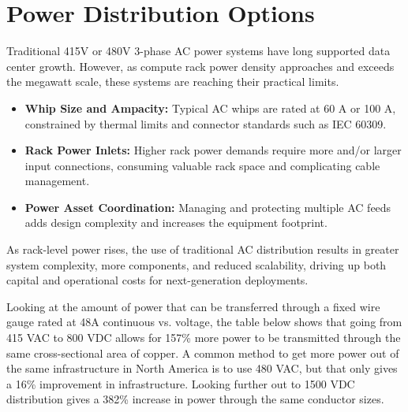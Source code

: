 \section{Power Distribution Options}

Traditional 415V or 480V 3-phase AC power systems have long supported data center growth. However, as compute rack power density approaches and exceeds the megawatt scale, these systems are reaching their practical limits.

\begin{itemize}
\item \textbf{Whip Size and Ampacity:} Typical AC whips are rated at 60 A or 100 A, constrained by thermal limits and connector standards such as IEC 60309.

\item \textbf{Rack Power Inlets:} Higher rack power demands require more and/or larger input connections, consuming valuable rack space and complicating cable management.

\item \textbf{Power Asset Coordination:} Managing and protecting multiple AC feeds adds design complexity and increases the equipment footprint.
\end{itemize}

As rack-level power rises, the use of traditional AC distribution results in greater system complexity, more components, and reduced scalability, driving up both capital and operational costs for next-generation deployments.

Looking at the amount of power that can be transferred through a fixed wire gauge rated at 48A continuous vs. voltage, the table below shows that going from 415 VAC to 800 VDC allows for 157\% more power to be transmitted through the same cross-sectional area of copper. A common method to get more power out of the same infrastructure in North America is to use 480 VAC, but that only gives a 16\% improvement in infrastructure. Looking further out to 1500 VDC distribution gives a 382\% increase in power through the same conductor sizes.


